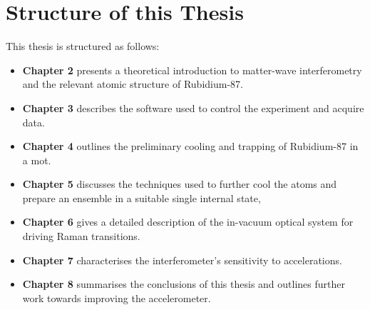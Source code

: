 \section{Structure of this Thesis}
This thesis is structured as follows:
\begin{itemize}
  \item \textbf{Chapter 2} presents a theoretical introduction to
    matter-wave interferometry and the relevant atomic structure of
    Rubidium-87.
  \item \textbf{Chapter 3} describes the software used to control the
    experiment and acquire data.
  \item \textbf{Chapter 4} outlines the preliminary cooling and
    trapping of Rubidium-87 in a \ac{mot}.
  \item \textbf{Chapter 5} discusses the techniques used to further
    cool the atoms and prepare an ensemble in a suitable single internal state,
  \item \textbf{Chapter 6} gives a detailed description of the
    in-vacuum optical system for driving Raman transitions.
  \item \textbf{Chapter 7} characterises the interferometer's
    sensitivity to accelerations.
  \item \textbf{Chapter 8} summarises the conclusions of this thesis and outlines
    further work towards improving the accelerometer.
\end{itemize}


